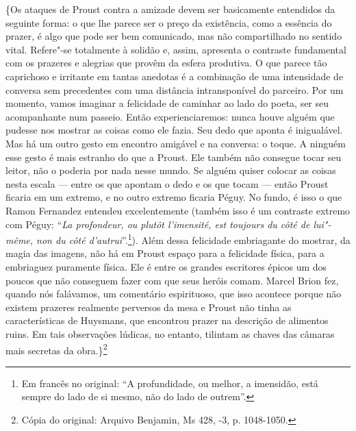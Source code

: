 \{Os ataques de Proust contra a amizade devem ser basicamente entendidos
da seguinte forma: o que lhe parece ser o preço da existência, como a
essência do prazer, é algo que pode ser bem comunicado, mas não
compartilhado no sentido vital. Refere"-se totalmente à solidão e, assim,
apresenta o contraste fundamental com os prazeres e alegrias que provêm
da esfera produtiva. O que parece tão caprichoso e irritante em tantas
anedotas é a combinação de uma intensidade de conversa sem precedentes
com uma distância intransponível do parceiro. Por um momento, vamos
imaginar a felicidade de caminhar ao lado do poeta, ser seu acompanhante
num passeio. Então experienciaremos: nunca houve alguém que pudesse nos
mostrar as coisas como ele fazia. Seu dedo que aponta é inigualável. Mas
há um outro gesto em encontro amigável e na conversa: o toque. A ninguém
esse gesto é mais estranho do que a Proust. Ele também não consegue
tocar seu leitor, não o poderia por nada nesse mundo. Se alguém quiser
colocar as coisas nesta escala --- entre os que apontam o dedo e os que
tocam --- então Proust ficaria em um extremo, e no outro extremo ficaria
Péguy. No fundo, é isso o que Ramon Fernandez entendeu excelentemente
(também isso é um contraste extremo com Péguy: ``\emph{La profondeur, ou
plutôt l'imensité, est toujours du côté de lui"-même, non du côté
d'autrui}''.\footnote{Em francês no original: ``A profundidade, ou melhor, a imensidão,
  está sempre do lado de si mesmo, não do lado de outrem''. \versal{[N. T.]}}). Além
dessa felicidade embriagante do mostrar, da magia das imagens, não há em
Proust espaço para a felicidade física, para a embriaguez puramente
física. Ele é entre os grandes escritores épicos um dos poucos que não
conseguem fazer com que seus heróis comam. Marcel Brion fez, quando nós
falávamos, um comentário espirituoso, que isso acontece porque não
existem prazeres realmente perversos da mesa e Proust não tinha as
características de Huysmans, que encontrou prazer na descrição de
alimentos ruins. Em tais observações lúdicas, no entanto, tilintam as
chaves das câmaras mais secretas da obra.\}\footnote{Cópia do original: Arquivo Benjamin, Ms 428, -3, p. 1048-1050.}

